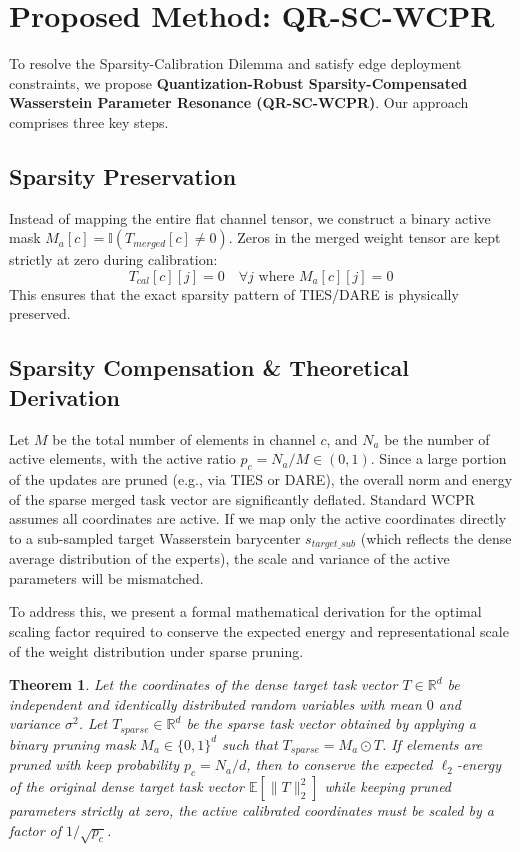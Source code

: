 \documentclass{article}
\theoremstyle{plain}
\newtheorem{theorem}{Theorem}[section]
\theoremstyle{definition}
\theoremstyle{remark}
\begin{document}
\section{Proposed Method: QR-SC-WCPR}
\label{sec:method}

To resolve the Sparsity-Calibration Dilemma and satisfy edge deployment constraints, we propose \textbf{Quantization-Robust Sparsity-Compensated Wasserstein Parameter Resonance (QR-SC-WCPR)}. Our approach comprises three key steps.

\subsection{Sparsity Preservation}
Instead of mapping the entire flat channel tensor, we construct a binary active mask $M_a[c] = \mathbb{I}(T_{merged}[c] \neq 0)$. Zeros in the merged weight tensor are kept strictly at zero during calibration:
\begin{equation}
    T_{cal}[c][j] = 0 \quad \forall j \text{ where } M_a[c][j] = 0
\end{equation}
This ensures that the exact sparsity pattern of TIES/DARE is physically preserved.

\subsection{Sparsity Compensation \& Theoretical Derivation}
\label{subsec:theory}

Let $M$ be the total number of elements in channel $c$, and $N_a$ be the number of active elements, with the active ratio $p_c = N_a / M \in (0, 1)$. Since a large portion of the updates are pruned (e.g., via TIES or DARE), the overall norm and energy of the sparse merged task vector are significantly deflated. Standard WCPR assumes all coordinates are active. If we map only the active coordinates directly to a sub-sampled target Wasserstein barycenter $s_{target\_sub}$ (which reflects the dense average distribution of the experts), the scale and variance of the active parameters will be mismatched.

To address this, we present a formal mathematical derivation for the optimal scaling factor required to conserve the expected energy and representational scale of the weight distribution under sparse pruning.

\begin{theorem} \label{thm:energy_conservation}
Let the coordinates of the dense target task vector $T \in \mathbb{R}^d$ be independent and identically distributed random variables with mean $0$ and variance $\sigma^2$. Let $T_{sparse} \in \mathbb{R}^d$ be the sparse task vector obtained by applying a binary pruning mask $M_a \in \{0, 1\}^d$ such that $T_{sparse} = M_a \odot T$. If elements are pruned with keep probability $p_c = N_a / d$, then to conserve the expected $\ell_2$-energy of the original dense target task vector $\mathbb{E}[\|T\|_2^2]$ while keeping pruned parameters strictly at zero, the active calibrated coordinates must be scaled by a factor of $1 / \sqrt{p_c}$.
\end{theorem}
\end{document}
